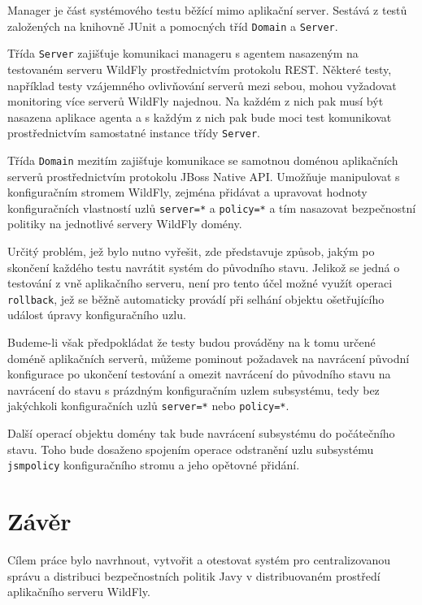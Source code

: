 Manager je část systémového testu běžící mimo aplikační server. Sestává z testů založených na knihovně JUnit a pomocných tříd {\tt Domain} a {\tt Server}.

Třída {\tt Server} zajišťuje komunikaci manageru s agentem nasazeným na testovaném serveru WildFly prostřednictvím protokolu REST. Některé testy, například testy vzájemného ovlivňování serverů mezi sebou, mohou vyžadovat monitoring více serverů WildFly najednou. Na každém z nich pak musí být nasazena aplikace agenta a s každým z nich pak bude moci test komunikovat prostřednictvím samostatné instance třídy {\tt Server}.

Třída {\tt Domain} mezitím zajišťuje komunikace se samotnou doménou aplikačních serverů prostřednictvím protokolu JBoss Native API. Umožňuje manipulovat s konfiguračním stromem WildFly, zejména přidávat a upravovat hodnoty konfiguračních vlastností uzlů {\tt server=*} a {\tt policy=*} a tím nasazovat bezpečnostní politiky na jednotlivé servery WildFly domény.

Určitý problém, jež bylo nutno vyřešit, zde představuje způsob, jakým po skončení každého testu navrátit systém do původního stavu. Jelikož se jedná o testování z vně aplikačního serveru, není pro tento účel možné využít operaci {\tt rollback}, jež se běžně automaticky provádí při selhání objektu ošetřujícího událost úpravy konfiguračního uzlu.

Budeme-li však předpokládat že testy budou prováděny na k tomu určené doméně aplikačních serverů, můžeme pominout požadavek na navrácení původní konfigurace po ukončení testování a omezit navrácení do původního stavu na navrácení do stavu s prázdným konfiguračním uzlem subsystému, tedy bez jakýchkoli konfiguračních uzlů 
{\tt server=*} nebo {\tt policy=*}.

Další operací objektu domény tak bude navrácení subsystému do počátečního stavu. Toho bude dosaženo spojením operace odstranění uzlu subsystému {\tt jsmpolicy} konfiguračního stromu a jeho opětovné přidání.

\chapter{Závěr}

Cílem práce bylo navrhnout, vytvořit a otestovat systém pro centralizovanou správu a distribuci bezpečnostních politik Javy v distribuovaném prostředí aplikačního serveru WildFly.


